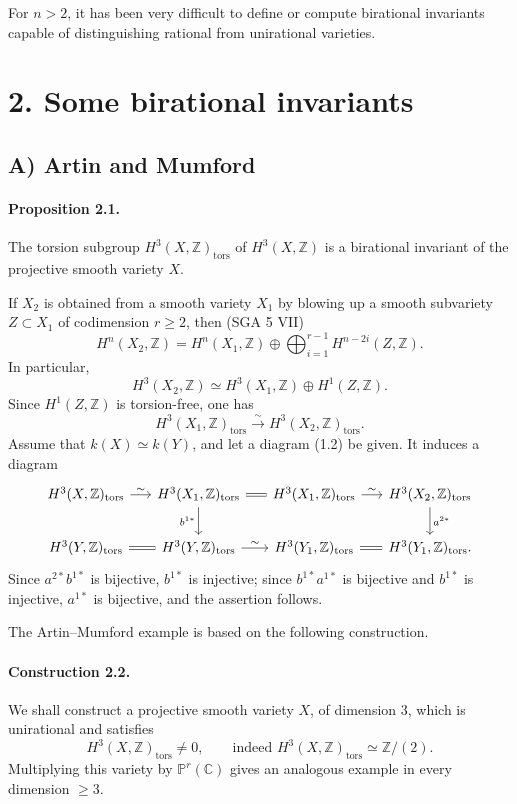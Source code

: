 \documentclass[10pt]{article}
\newcommand{\C}{\mathbb C}
\newcommand{\Pj}{\mathbb P}
\newcommand{\Z}{\mathbb Z}
\newcommand{\tors}{\operatorname{tors}}
\newcommand{\iso}{\xrightarrow{\sim}}
\begin{document}
For \(n>2\), it has been very difficult to define or compute birational invariants capable of distinguishing rational from unirational varieties.

\section*{2. Some birational invariants}

\subsection*{A) Artin and Mumford}

\paragraph{Proposition 2.1.} The torsion subgroup \(H^3(X,\Z)_{\tors}\) of \(H^3(X,\Z)\) is a birational invariant of the projective smooth variety \(X\).

If \(X_2\) is obtained from a smooth variety \(X_1\) by blowing up a smooth subvariety \(Z\subset X_1\) of codimension \(r\ge2\), then (SGA 5 VII)
\[
H^n(X_2,\Z)=H^n(X_1,\Z)\oplus\bigoplus_{i=1}^{r-1}H^{n-2i}(Z,\Z).
\]
In particular,
\[
H^3(X_2,\Z)\simeq H^3(X_1,\Z)\oplus H^1(Z,\Z).
\]
Since \(H^1(Z,\Z)\) is torsion-free, one has
\[
H^3(X_1,\Z)_{\tors}\iso H^3(X_2,\Z)_{\tors}.
\]
Assume that \(k(X)\simeq k(Y)\), and let a diagram (1.2) be given. It induces a diagram
\[
\begin{tikzcd}[column sep=1.5em,row sep=2.0em]
H^3(X,\Z)_{\tors}\arrow[r,"\sim"]&H^3(X_1,\Z)_{\tors}\arrow[r,equal]\arrow[d,"b^{1*}"']&H^3(X_1,\Z)_{\tors}\arrow[r,"\sim"]&H^3(X_2,\Z)_{\tors}\arrow[d,"a^{2*}"]\\
H^3(Y,\Z)_{\tors}\arrow[r,equal]&H^3(Y,\Z)_{\tors}\arrow[r,"\sim"]&H^3(Y_1,\Z)_{\tors}\arrow[r,equal]&H^3(Y_1,\Z)_{\tors}.
\end{tikzcd}
\]
Since \(a^{2*}b^{1*}\) is bijective, \(b^{1*}\) is injective; since \(b^{1*}a^{1*}\) is bijective and \(b^{1*}\) is injective, \(a^{1*}\) is bijective, and the assertion follows.

The Artin--Mumford example is based on the following construction.

\paragraph{Construction 2.2.} We shall construct a projective smooth variety \(X\), of dimension \(3\), which is unirational and satisfies
\[
H^3(X,\Z)_{\tors}\ne0,
\qquad\text{indeed }H^3(X,\Z)_{\tors}\simeq\Z/(2).
\]
Multiplying this variety by \(\Pj^r(\C)\) gives an analogous example in every dimension \(\ge3\).
\end{document}
